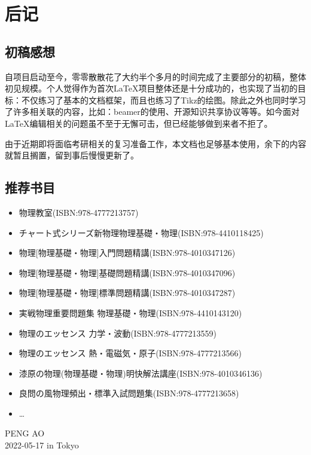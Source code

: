 
\chapter{后记}

\section*{初稿感想}
自项目启动至今，零零散散花了大约半个多月的时间完成了主要部分的初稿，整体初见规模。个人觉得作为首次\LaTeX 项目整体还是十分成功的，也实现了当初的目标：不仅练习了基本的文档框架，而且也练习了Tikz的绘图。除此之外也同时学习了许多相关联的内容，比如：beamer的使用、开源知识共享协议等等。如今面对\LaTeX 编辑相关的问题虽不至于无懈可击，但已经能够做到来者不拒了。

由于近期即将面临考研相关的复习准备工作，本文档也足够基本使用，余下的内容就暂且搁置，留到事后慢慢更新了。

\section*{推荐书目}
\begin{itemize}
    \item 物理教室(ISBN:978-4777213757)
    \item チャート式シリーズ新物理物理基礎・物理(ISBN:978-4410118425)
    \item 物理[物理基礎・物理]入門問題精講(ISBN:978-4010347126)
    \item 物理[物理基礎・物理]基礎問題精講(ISBN:978-4010347096)
    \item 物理[物理基礎・物理]標準問題精講(ISBN:978-4010347287)
    \item 実戦物理重要問題集 物理基礎・物理(ISBN:978-4410143120)
    \item 物理のエッセンス 力学・波動(ISBN:978-4777213559)
    \item 物理のエッセンス 熱・電磁気・原子(ISBN:978-4777213566)
    \item 漆原の物理(物理基礎・物理)明快解法講座(ISBN:978-4010346136)
    \item 良問の風物理頻出・標準入試問題集(ISBN:978-4777213658)
    \item \ldots
\end{itemize}

\vfill
\begin{flushright}
    PENG AO\\
    2022-05-17 in Tokyo
\end{flushright}
